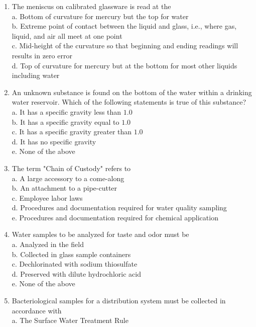 \begin{enumerate}[1.]
  \item The meniscus on calibrated glassware is read at the\\
a. Bottom of curvature for mercury but the top for water\\
b. Extreme point of contact between the liquid and glass, i.e., where gas, liquid, and air all meet at one point\\
c. Mid-height of the curvature so that beginning and ending readings will results in zero error\\
d. Top of curvature for mercury but at the bottom for most other liquids including water\\
  \item An unknown substance is found on the bottom of the water within a drinking water reservoir. Which of the following statements is true of this substance?\\
a. It has a specific gravity less than $1.0$\\
b. It has a specific gravity equal to $1.0$\\
c. It has a specific gravity greater than $1.0$\\
d. It has no specific gravity\\
e. None of the above\\
  \item The term "Chain of Custody" refers to\\
a. A large accessory to a come-along\\
b. An attachment to a pipe-cutter\\
c. Employee labor laws\\
d. Procedures and documentation required for water quality sampling\\
e. Procedures and documentation required for chemical application\\
  \item Water samples to be analyzed for taste and odor must be\\
a. Analyzed in the field\\
b. Collected in glass sample containers\\
c. Dechlorinated with sodium thiosulfate\\
d. Preserved with dilute hydrochloric acid\\
e. None of the above\\
  \item Bacteriological samples for a distribution system must be collected in accordance with\\
a. The Surface Water Treatment Rule\\

\end{enumerate}
